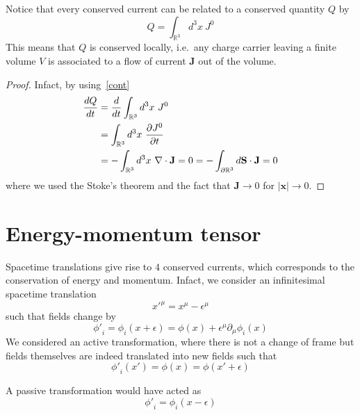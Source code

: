     Notice that every conserved current can be related to a conserved quantity $Q$ by 
    \begin{equation*}
        Q = \int_{\mathbb R^3} d^3 x ~J^0
    \end{equation*}
    This means that $Q$ is conserved locally, i.e.~any charge carrier leaving a finite volume $V$ is associated to a flow of current $\mathbf J$ out of the volume.

    \begin{proof}
        Infact, by using~\eqref{cont}
        \begin{equation*}
        \begin{aligned}
            \frac{dQ}{dt} & = \frac{d}{dt} \int_{\mathbb R^3} d^3 x ~ J^0 \\ & = \int_{\mathbb R^3} d^3 x ~ \frac{\partial J^0}{\partial t} \\ & = - \int_{\mathbb R^3} d^3 x ~ \nabla \cdot \mathbf J = 0 = -  \int_{\partial \mathbb R^3} d \mathbf S \cdot \mathbf J = 0
        \end{aligned}
        \end{equation*}
        where we used the Stoke's theorem and the fact that $\mathbf J \rightarrow 0$ for $|\mathbf x| \rightarrow 0$.
    \end{proof}

\chapter{Energy-momentum tensor}

    Spacetime translations give rise to $4$ conserved currents, which corresponds to the conservation of energy and momentum. Infact, we consider an infinitesimal spacetime translation 
    \begin{equation*}
        {x'}^\mu = x^\mu - \epsilon^\mu
    \end{equation*}
    such that fields change by 
    \begin{equation*}
        {\phi'}_i = \phi_i (x + \epsilon) = \phi(x) + \epsilon^\mu \partial_\mu \phi_i (x)
    \end{equation*}
    We considered an active transformation, where there is not a change of frame but fields themselves are indeed translated into new fields such that 
    \begin{equation*}
        {\phi'}_i (x') = \phi(x) = \phi(x' + \epsilon)
    \end{equation*}

    A passive transformation would have acted as 
    \begin{equation*}
        {\phi'}_i = \phi_i (x - \epsilon) 
    \end{equation*}

